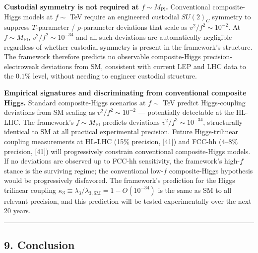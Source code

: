 \documentclass[
]{article}
\begin{document}
\textbf{Custodial symmetry is not required at
\(f \sim M_{\mathrm{Pl}}\).} Conventional composite-Higgs models at
\(f \sim\) TeV require an engineered custodial \(SU(2)_C\) symmetry to
suppress \(T\)-parameter / \(\rho\)-parameter deviations that scale as
\(v^2/f^2 \sim 10^{-2}\). At \(f \sim M_{\mathrm{Pl}}\),
\(v^2/f^2 \sim 10^{-34}\) and all such deviations are automatically
negligible regardless of whether custodial symmetry is present in the
framework's structure. The framework therefore predicts no observable
composite-Higgs precision-electroweak deviations from SM, consistent
with current LEP and LHC data to the \(0.1\%\) level, without needing to
engineer custodial structure.

\textbf{Empirical signatures and discriminating from conventional
composite Higgs.} Standard composite-Higgs scenarios at \(f \sim\) TeV
predict Higgs-coupling deviations from SM scaling as
\(v^2/f^2 \sim 10^{-2}\) --- potentially detectable at the HL-LHC. The
framework's \(f \sim M_{\mathrm{Pl}}\) predicts deviations
\(v^2/f^2 \sim 10^{-34}\), structurally identical to SM at all practical
experimental precision. Future Higgs-trilinear coupling measurements at
HL-LHC (15\% precision, {[}41{]}) and FCC-hh (4--8\% precision,
{[}41{]}) will progressively constrain conventional composite-Higgs
models. If no deviations are observed up to FCC-hh sensitivity, the
framework's high-\(f\) stance is the surviving regime; the conventional
low-\(f\) composite-Higgs hypothesis would be progressively disfavored.
The framework's prediction for the Higgs trilinear coupling
\(\kappa_3 \equiv \lambda_3/\lambda_{3,\text{SM}} = 1 - O(10^{-34})\) is
the same as SM to all relevant precision, and this prediction will be
tested experimentally over the next 20 years.

\begin{center}\rule{0.5\linewidth}{0.5pt}\end{center}

\hypertarget{conclusion}{%
\subsection{9. Conclusion}\label{conclusion}}
\end{document}

